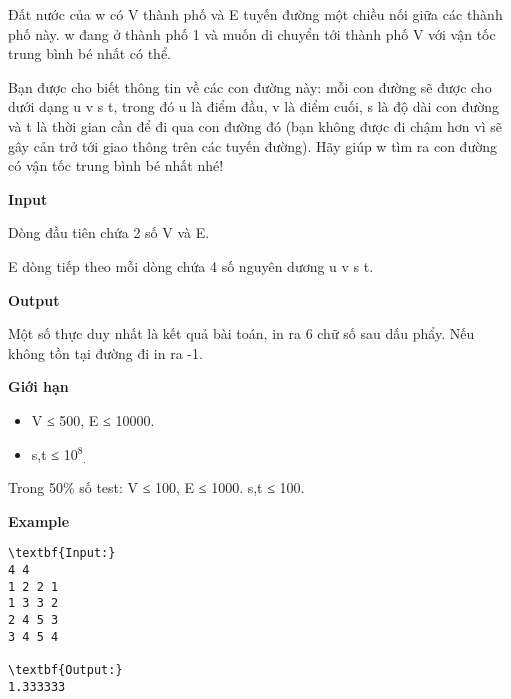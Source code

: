 

Đất nước của w có V thành phố và E tuyến đường một chiều nối giữa các thành phố này. w đang ở thành phố 1 và muốn di chuyển tới thành phố V với vận tốc trung bình bé nhất có thể.

Bạn được cho biết thông tin về các con đường này: mỗi con đường sẽ được cho dưới dạng u v s t, trong đó u là điểm đầu, v là điểm cuối, s là độ dài con đường và t là thời gian cần để đi qua con đường đó (bạn không được đi chậm hơn vì sẽ gây cản trở tới giao thông trên các tuyến đường). Hãy giúp w tìm ra con đường có vận tốc trung bình bé nhất nhé!

\textbf{Input }

Dòng đầu tiên chứa 2 số V và E.

E dòng tiếp theo mỗi dòng chứa 4 số nguyên dương u v s t.

\textbf{Output }

Một số thực duy nhất là kết quả bài toán, in ra 6 chữ số sau dấu phẩy. Nếu không tồn tại đường đi in ra -1.

\textbf{Giới hạn}
\begin{itemize}
	\item V ≤ 500, E ≤ 10000.
	\item s,t ≤ 10$^8$$_.$
\end{itemize}

Trong 50\% số test: V ≤ 100, E ≤ 1000. s,t ≤ 100.

\textbf{Example}
\begin{verbatim}
\textbf{Input:}
4 4
1 2 2 1
1 3 3 2
2 4 5 3
3 4 5 4

\textbf{Output:}
1.333333\end{verbatim}